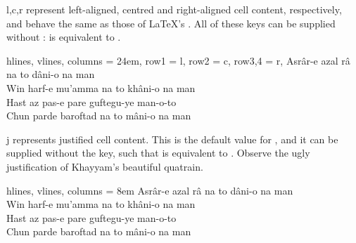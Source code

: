 \begin{codedescribe}[
    value,
    new=2021A,
    update=2021L
  ]{l,c,r}
   represent left-aligned, centred and right-aligned cell content, respectively, and behave the same as those of \LaTeX's . All of these keys can be supplied without :  is equivalent to .

  \begin{codestore}[st=columns:lcr]
    \begin{tblr}{
      hlines, vlines,
      columns = {24em},
      row{1} = {l},
      row{2} = {c},
      row{3,4} = {r},
        }
      Asrâr-e azal râ na to dâni-o na man     \\
      Win harf-e mu’amma na to khâni-o na man \\
      Hast az pas-e pare guftegu-ye man-o-to  \\
      Chun parde baroftad na to mâni-o na man
    \end{tblr}\end{codestore}
  \begin{center}
  \end{center}
\end{codedescribe}

\begin{codedescribe}[
    value,
    new=2021N
  ]{j}
   represents justified cell content. This is the default value for , and it can be supplied without the key, such that  is equivalent to . Observe the ugly justification of Khayyam's beautiful quatrain.

  \begin{codestore}[st=columns:j]
    \begin{tblr}{
        hlines, vlines,
        columns = {8em} %
      }
      Asrâr-e azal râ na to dâni-o na man     \\
      Win harf-e mu’amma na to khâni-o na man \\
      Hast az pas-e pare guftegu-ye man-o-to  \\
      Chun parde baroftad na to mâni-o na man
    \end{tblr}\end{codestore}
  \begin{center}
  \end{center}
\end{codedescribe}

